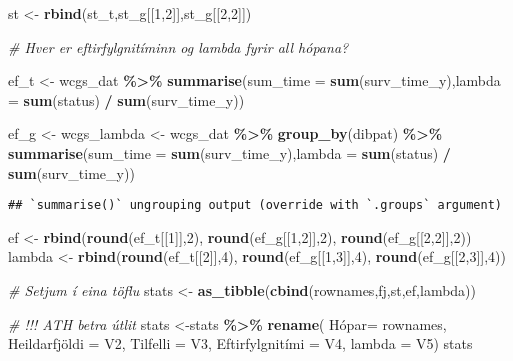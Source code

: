\documentclass[
]{book}
\newenvironment{Shaded}{\begin{snugshade}}{\end{snugshade}}
\newcommand{\CommentTok}[1]{\textcolor[rgb]{0.56,0.35,0.01}{\textit{#1}}}
\newcommand{\DataTypeTok}[1]{\textcolor[rgb]{0.13,0.29,0.53}{#1}}
\newcommand{\DecValTok}[1]{\textcolor[rgb]{0.00,0.00,0.81}{#1}}
\newcommand{\KeywordTok}[1]{\textcolor[rgb]{0.13,0.29,0.53}{\textbf{#1}}}
\newcommand{\NormalTok}[1]{#1}
\newcommand{\OperatorTok}[1]{\textcolor[rgb]{0.81,0.36,0.00}{\textbf{#1}}}
\newcommand{\StringTok}[1]{\textcolor[rgb]{0.31,0.60,0.02}{#1}}
\begin{document}
\begin{Shaded}
\begin{Highlighting}[]
\NormalTok{st <{-}}\StringTok{ }\KeywordTok{rbind}\NormalTok{(st\_t,st\_g[[}\DecValTok{1}\NormalTok{,}\DecValTok{2}\NormalTok{]],st\_g[[}\DecValTok{2}\NormalTok{,}\DecValTok{2}\NormalTok{]])}

\CommentTok{\# Hver er eftirfylgnitíminn og lambda fyrir all hópana?}

\NormalTok{ef\_t <{-}}\StringTok{ }\NormalTok{wcgs\_dat }\OperatorTok{\%>\%}\StringTok{ }
\StringTok{  }\KeywordTok{summarise}\NormalTok{(}\DataTypeTok{sum\_time =} \KeywordTok{sum}\NormalTok{(surv\_time\_y),}\DataTypeTok{lambda =} \KeywordTok{sum}\NormalTok{(status) }\OperatorTok{/}\StringTok{ }\KeywordTok{sum}\NormalTok{(surv\_time\_y))}

\NormalTok{ef\_g <{-}}\StringTok{ }\NormalTok{wcgs\_lambda <{-}}\StringTok{ }\NormalTok{wcgs\_dat }\OperatorTok{\%>\%}\StringTok{ }
\StringTok{  }\KeywordTok{group\_by}\NormalTok{(dibpat) }\OperatorTok{\%>\%}\StringTok{ }
\StringTok{  }\KeywordTok{summarise}\NormalTok{(}\DataTypeTok{sum\_time =} \KeywordTok{sum}\NormalTok{(surv\_time\_y),}\DataTypeTok{lambda =} \KeywordTok{sum}\NormalTok{(status) }\OperatorTok{/}\StringTok{ }\KeywordTok{sum}\NormalTok{(surv\_time\_y))}
\end{Highlighting}
\end{Shaded}

\begin{verbatim}
## `summarise()` ungrouping output (override with `.groups` argument)
\end{verbatim}

\begin{Shaded}
\begin{Highlighting}[]
\NormalTok{ef <{-}}\StringTok{ }\KeywordTok{rbind}\NormalTok{(}\KeywordTok{round}\NormalTok{(ef\_t[[}\DecValTok{1}\NormalTok{]],}\DecValTok{2}\NormalTok{), }\KeywordTok{round}\NormalTok{(ef\_g[[}\DecValTok{1}\NormalTok{,}\DecValTok{2}\NormalTok{]],}\DecValTok{2}\NormalTok{), }\KeywordTok{round}\NormalTok{(ef\_g[[}\DecValTok{2}\NormalTok{,}\DecValTok{2}\NormalTok{]],}\DecValTok{2}\NormalTok{))}
\NormalTok{lambda <{-}}\StringTok{ }\KeywordTok{rbind}\NormalTok{(}\KeywordTok{round}\NormalTok{(ef\_t[[}\DecValTok{2}\NormalTok{]],}\DecValTok{4}\NormalTok{), }\KeywordTok{round}\NormalTok{(ef\_g[[}\DecValTok{1}\NormalTok{,}\DecValTok{3}\NormalTok{]],}\DecValTok{4}\NormalTok{), }\KeywordTok{round}\NormalTok{(ef\_g[[}\DecValTok{2}\NormalTok{,}\DecValTok{3}\NormalTok{]],}\DecValTok{4}\NormalTok{))}

\CommentTok{\# Setjum í eina töflu}
\NormalTok{stats <{-}}\StringTok{ }\KeywordTok{as\_tibble}\NormalTok{(}\KeywordTok{cbind}\NormalTok{(rownames,fj,st,ef,lambda))}

\CommentTok{\# !!! ATH betra útlit}
\NormalTok{stats <{-}stats }\OperatorTok{\%>\%}\StringTok{ }\KeywordTok{rename}\NormalTok{( Hópar=}\StringTok{ }\NormalTok{rownames, Heildarfjöldi =}\StringTok{ }\NormalTok{V2,  }\DataTypeTok{Tilfelli =}\NormalTok{ V3, Eftirfylgnitími =}\StringTok{ }\NormalTok{V4, }\DataTypeTok{lambda =}\NormalTok{ V5)}
\NormalTok{stats}
\end{Highlighting}
\end{Shaded}
\end{document}
